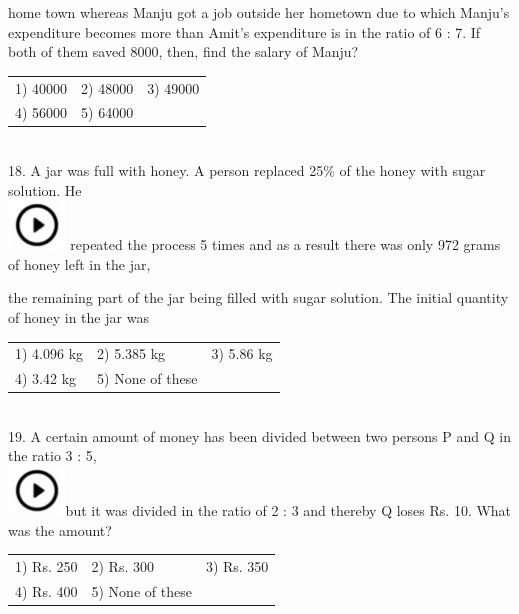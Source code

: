 \documentclass{article}
\begin{document}
\noindent home  town  whereas  Manju  got  a  job  outside  her  hometown  due  to  which  Manju's expenditure becomes more than Amit's expenditure is in the ratio of 6 : 7. If both of them saved 8000, then, find the salary of Manju?

\noindent \begin{tabular}{p{1.7in} p{1.6in} p{1.6in}} \\ 
 1) 40000                  &  2) 48000           &  3) 49000            \\
4) 56000           & 5) 64000 \\
\end{tabular}

\noindent \\  
18. A jar was full with honey. A person replaced 25\% of the honey with sugar solution. He  
	\noindent \\ \includegraphics*[width=0.60in, height=0.52in]{images/image1} repeated the process 5 times and as a result there was only 972 grams of honey left in the jar,

\noindent the remaining part of the jar being filled with sugar solution. The initial quantity of honey in the jar was

\noindent 

\noindent \begin{tabular}{p{1.7in} p{1.6in} p{1.6in}} \\ 
	
 1) 4.096 kg             &  2) 5.385 kg       &  3) 5.86 kg         \\
4) 3.42 kg        & 5) None of these  \\
\end{tabular}
\noindent \\  
19. A certain amount of money has been divided between two persons P and Q in the ratio 3 : 5,  
	\noindent \\ \includegraphics*[width=0.60in, height=0.52in]{images/image1}but it was divided in the ratio of 2 : 3 and thereby Q loses Rs. 10. What was the amount?

\noindent 
\begin{tabular}{p{1.7in} p{1.6in} p{1.6in}} \\ 
 1) Rs. 250               &  2) Rs. 300         &  3) Rs. 350         \\
4) Rs. 400        & 5) None of these  \\
\end{tabular}
\end{document}
